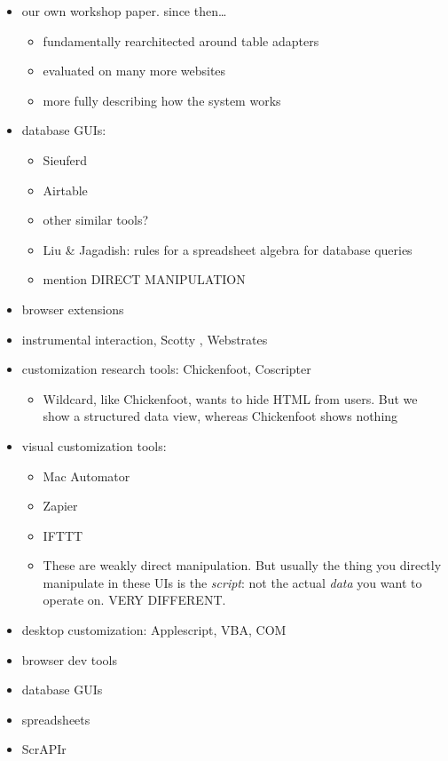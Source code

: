 \documentclass[sigplan,10pt,anonymous,review]{acmart}
\providecommand{\tightlist}{%
  \setlength{\itemsep}{0pt}\setlength{\parskip}{0pt}}
\begin{document}
\begin{itemize}
\tightlist
\item
  our own workshop paper. since then\ldots{}

  \begin{itemize}
  \tightlist
  \item
    fundamentally rearchitected around table adapters
  \item
    evaluated on many more websites
  \item
    more fully describing how the system works
  \end{itemize}
\item
  database GUIs:

  \begin{itemize}
  \tightlist
  \item
    Sieuferd \citep{bakke2016}
  \item
    Airtable \citep{2020a}
  \item
    other similar tools?
  \item
    Liu \& Jagadish: rules for a spreadsheet algebra for database
    queries \citep{liu2009}
  \item
    mention DIRECT MANIPULATION
  \end{itemize}
\item
  browser extensions
\item
  instrumental interaction, Scotty \citep{eagan2011}, Webstrates
\item
  customization research tools: Chickenfoot, Coscripter

  \begin{itemize}
  \tightlist
  \item
    Wildcard, like Chickenfoot, wants to hide HTML from users. But we
    show a structured data view, whereas Chickenfoot shows nothing
  \end{itemize}
\item
  visual customization tools:

  \begin{itemize}
  \tightlist
  \item
    Mac Automator
  \item
    Zapier
  \item
    IFTTT
  \item
    These are weakly direct manipulation. But usually the thing you
    directly manipulate in these UIs is the \emph{script}: not the
    actual \emph{data} you want to operate on. VERY DIFFERENT.
  \end{itemize}
\item
  desktop customization: Applescript, VBA, COM
\item
  browser dev tools
\item
  database GUIs
\item
  spreadsheets
\item
  ScrAPIr
\end{itemize}



\end{document}
